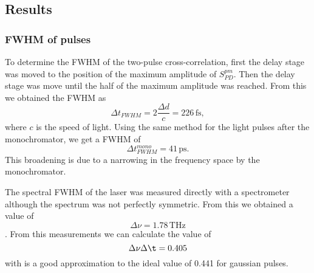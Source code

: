 \documentclass{report}
\begin{document}
\subsection*{Results}
\subsubsection*{FWHM of pulses}
  To determine the FWHM of the two-pulse cross-correlation, first the delay
  stage was moved to the position of the maximum amplitude of $S^{pm}_{PD}$. Then
  the delay stage was move until the half of the maximum amplitude was reached.
  From this we obtained the FWHM as
  $$\Delta t_{FWHM} = 2 \frac{\Delta d}{c} = 226\,\textrm{fs},  $$
  where $c$ is the speed of light. Using the same method for the light pulses
  after the monochromator, we get a FWHM of
  $$ \Delta t_{FWHM}^{mono} = 41\,\textrm{ps}. $$
  This broadening is due to a narrowing in the frequency space by the
  monochromator.

  The spectral FWHM of the laser was measured directly with a spectrometer
  although the spectrum was not perfectly symmetric. From
  this we obtained a value of 
  $$ \Delta \nu = 1.78\,\textrm{THz} $$.
  From this measurements we can calculate the value of
  $$\Delta\nu\Delta\t = 0.405$$
  with is a good approximation to the ideal value of 0.441 for gaussian pulses.
\end{document}
